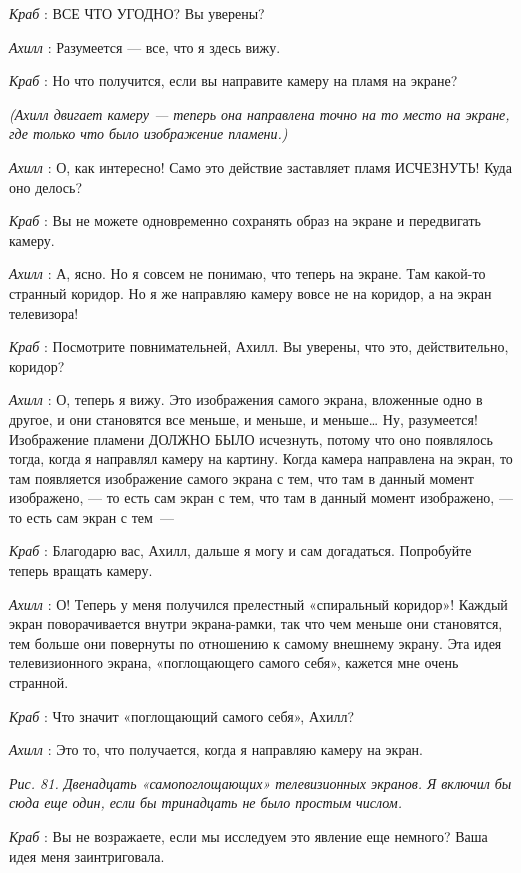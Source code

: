 \documentclass[../main.tex]{subfiles}
\begin{document}
\begin{dialogue}
\emph{Краб} : ВСЕ ЧТО УГОДНО? Вы уверены?

\emph{Ахилл} : Разумеется --- все, что я здесь вижу.

\emph{Краб} : Но что получится, если вы направите камеру на пламя на экране?

\emph{(Ахилл двигает камеру --- теперь она направлена точно на то место на экране, где только что было изображение пламени.)}

\emph{Ахилл} : О, как интересно! Само это действие заставляет пламя ИСЧЕЗНУТЬ! Куда оно делось?

\emph{Краб} : Вы не можете одновременно сохранять образ на экране и передвигать камеру.

\emph{Ахилл} : А, ясно. Но я совсем не понимаю, что теперь на экране. Там какой-то странный коридор. Но я же направляю камеру вовсе не на коридор, а на экран телевизора!

\emph{Краб} : Посмотрите повнимательней, Ахилл. Вы уверены, что это, действительно, коридор?

\emph{Ахилл} : О, теперь я вижу. Это изображения самого экрана, вложенные одно в другое, и они становятся все меньше, и меньше, и меньше\ldots{} Ну, разумеется! Изображение пламени ДОЛЖНО БЫЛО исчезнуть, потому что оно появлялось тогда, когда я направлял камеру на картину. Когда камера направлена на экран, то там появляется изображение самого экрана с тем, что там в данный момент изображено, --- то есть сам экран с тем, что там в данный момент изображено, --- то есть сам экран с тем~---

\emph{Краб} : Благодарю вас, Ахилл, дальше я могу и сам догадаться. Попробуйте теперь вращать камеру.

\emph{Ахилл} : О! Теперь у меня получился прелестный «спиральный коридор»! Каждый экран поворачивается внутри экрана-рамки, так что чем меньше они становятся, тем больше они повернуты по отношению к самому внешнему экрану. Эта идея телевизионного экрана, «поглощающего самого себя», кажется мне очень странной.

\emph{Краб} : Что значит «поглощающий самого себя», Ахилл?

\emph{Ахилл} : Это то, что получается, когда я направляю камеру на экран.

\emph{Рис. 81. Двенадцать «самопоглощающих» телевизионных экранов. Я включил бы сюда еще один, если бы тринадцать не было простым числом.}

\emph{Краб} : Вы не возражаете, если мы исследуем это явление еще немного? Ваша идея меня заинтриговала.


\end{dialogue}
\end{document}
